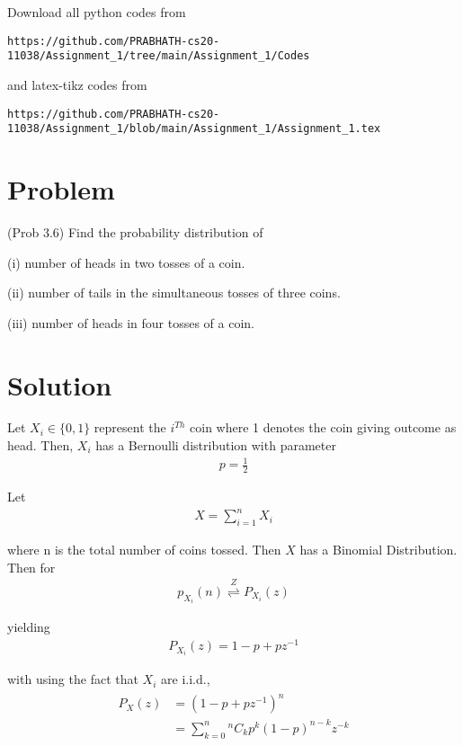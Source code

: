 \documentclass[journal,12pt,twocolumn]{IEEEtran}
\begin{document}
Download all python codes from 
\begin{lstlisting}
https://github.com/PRABHATH-cs20-11038/Assignment_1/tree/main/Assignment_1/Codes
\end{lstlisting}

and latex-tikz codes from
\begin{lstlisting}
https://github.com/PRABHATH-cs20-11038/Assignment_1/blob/main/Assignment_1/Assignment_1.tex
\end{lstlisting}

\section{Problem}
(Prob 3.6) Find the probability distribution of

(i) number of heads in two tosses of a coin.

(ii) number of tails in the simultaneous tosses of three coins.

(iii) number of heads in four tosses of a coin.
\section{Solution}

Let $X_i \in \{0, 1\}$ represent the $i^{Th}$ coin where 1 denotes the coin giving outcome as head. Then, $X_i$ has a Bernoulli distribution with parameter
\begin{align}
p = \frac{1}{2}
\end{align}

Let 
\begin{align}
X = \sum\limits_{i=1}^{n}X_i
\end{align}

where n is the total number of coins tossed. Then $X$ has a Binomial Distribution. Then for 
\begin{align}
    p_{X_i}(n) {\stackrel{Z}{\rightleftharpoons}} P_{X_i}(z)
\end{align}

yielding
\begin{align}
    P_{X_i}(z) = 1-p+p z^{-1}
\end{align}

with using the fact that $X_i$ are i.i.d.,
\begin{align}
\begin{split}
    P_X(z) &= (1-p+p z^{-1})^n\\
    &=\sum\limits_{k=0}^n{^n C_k}p^k(1-p)^{n-k}z^{-k}
\end{split}
\end{align}
\end{document}
